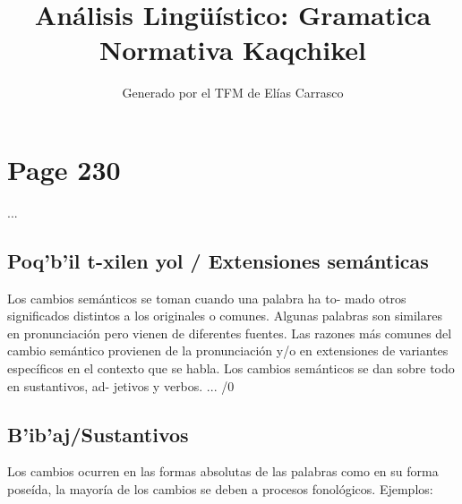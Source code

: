 \documentclass{article}%
\title{Análisis Lingüístico: Gramatica Normativa Kaqchikel}%
\author{Generado por el TFM de Elías Carrasco}%
\begin{document}
%
\normalsize%
\maketitle%
\section{Page 230}%
\label{sec:Page230}%
... %
\subsection{Poq'b'il t{-}xilen yol / Extensiones semánticas}%
\label{subsec:Poqbilt{-}xilenyol/Extensionessemnticas}%

%
Los cambios semánticos se toman cuando una palabra ha to{-} %
mado otros significados distintos a los originales o comunes. %
Algunas palabras son similares en pronunciación pero vienen %
de diferentes fuentes. %
Las razones más comunes del cambio semántico provienen de %
la pronunciación y/o en extensiones de variantes específicos %
en el contexto que se habla. %
Los cambios semánticos se dan sobre todo en sustantivos, ad{-} %
jetivos y verbos. %
... /0 %
\subsection{B'ib'aj/Sustantivos}%
\label{subsec:Bibaj/Sustantivos}%

%
Los cambios ocurren en las formas absolutas de las palabras %
como en su forma poseída, la mayoría de los cambios se deben %
a procesos fonológicos. %
Ejemplos: 

%
\end{document}
